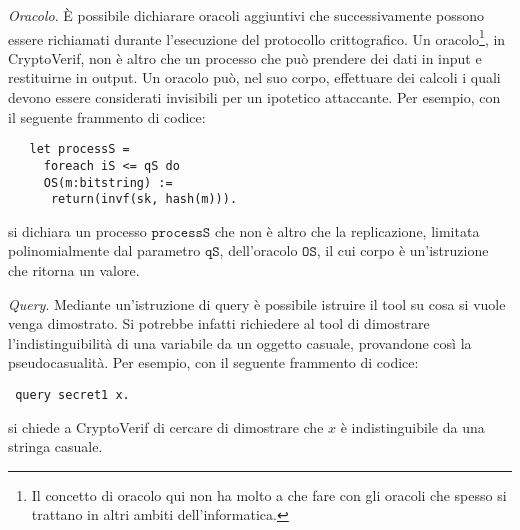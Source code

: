 \documentclass[a4paper,openright,twoside,12pt]{report}
\begin{document}
\begin{description}
 \item{\emph{Oracolo}.} \`E possibile dichiarare oracoli aggiuntivi che successivamente possono essere richiamati durante l'esecuzione
			  del protocollo crittografico. Un oracolo\footnote{Il concetto di oracolo qui non ha molto a che fare con gli oracoli che spesso si trattano in altri ambiti dell'informatica.}, in CryptoVerif, non \`e altro che un processo che pu\`o prendere
			  dei dati in input e restituirne in output. Un oracolo pu\`o, nel suo corpo, effettuare dei calcoli i quali devono
			  essere considerati invisibili per un ipotetico attaccante. Per esempio, con il seguente frammento di codice:
 \begin{verbatim}
   let processS =
     foreach iS <= qS do
     OS(m:bitstring) :=
      return(invf(sk, hash(m))).
 \end{verbatim}
si dichiara un processo $\texttt{processS}$ che non \`e altro che la replicazione, limitata polinomialmente dal parametro $\texttt{qS}$, dell'oracolo $\texttt{OS}$, il cui corpo \`e un'istruzione che ritorna un valore.
 \item{\emph{Query}.} Mediante un'istruzione di query \`e possibile istruire il tool su cosa si vuole venga dimostrato. Si potrebbe infatti richiedere
		    al tool di dimostrare l'indistinguibilit\`a di una variabile da un oggetto casuale, provandone cos\`i la pseudocasualit\`a.	Per esempio, con il seguente frammento di codice:
\begin{verbatim}
 query secret1 x.
\end{verbatim}
si chiede a CryptoVerif di cercare di dimostrare che $x$ \`e indistinguibile da una stringa casuale.
\end{description}
\end{document}
